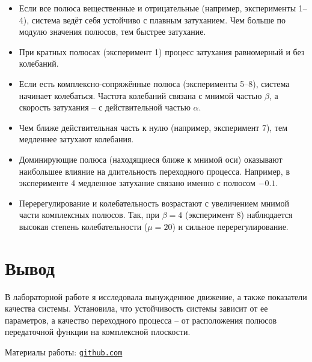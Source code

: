 \documentclass[a4paper,12pt]{article}
\begin{document}
	\begin{itemize}
		\item Если все полюса вещественные и отрицательные (например, эксперименты 1–4), система ведёт себя устойчиво с плавным затуханием. Чем больше по модулю значения полюсов, тем быстрее затухание.
		\item При кратных полюсах (эксперимент 1) процесс затухания равномерный и без колебаний.
		\item Если есть комплексно-сопряжённые полюса (эксперименты 5–8), система начинает колебаться. Частота колебаний связана с мнимой частью \(\beta\), а скорость затухания -- с действительной частью \(\alpha\).
		\item Чем ближе действительная часть к нулю (например, эксперимент 7), тем медленнее затухают колебания.
		\item Доминирующие полюса (находящиеся ближе к мнимой оси) оказывают наибольшее влияние на длительность переходного процесса. Например, в эксперименте 4 медленное затухание связано именно с полюсом \(-0.1\).
		\item Перерегулирование и колебательность возрастают с увеличением мнимой части комплексных полюсов. Так, при \(\beta = 4\) (эксперимент 8) наблюдается высокая степень колебательности (\(\mu = 20\)) и сильное перерегулирование.
	\end{itemize}
	
	
	
	
	

	
	\newpage
	\section{Вывод}
	
	В лабораторной работе я исследовала вынужденное движение, а также показатели качества системы. Установила, что  устойчивость системы зависит от ее параметров, а качество переходного процесса -- от расположения полюсов передаточной функции на комплексной плоскости.


	Материалы работы: \href{https://github.com/decadeos/ITMO/tree/master/3_course/lsau/lab3}{\texttt{github.com}}
	
\end{document}
